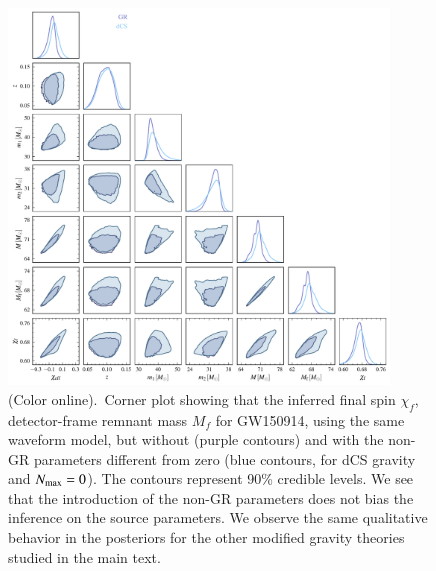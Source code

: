 \documentclass[twocolumn,
               prd,
               aps,
               superscriptaddress,
               tightenlines,
               nofootinbib,
               eqsecnum,
               amsfonts,
               amsmath,
               longbibliography]{revtex4-1}
\newcommand{\hs}[1]{{\textcolor{blue}{{[HS: #1]}} }}
\begin{document}
\begin{figure}[t]
\includegraphics[width=0.9\textwidth]{figs/tmp_GW150914_intrinsic_params.pdf}
\caption{(Color online).~Corner plot showing that the inferred final spin $\chi_f$,
detector-frame remnant mass $M_f$ for GW150914, using the same waveform model,
but without (purple contours) and with the non-GR parameters different from zero (blue contours, for
dCS gravity and $N_{\rm max}=0$). The contours represent 90\% credible levels.
%
We see that the introduction of the non-GR parameters does not bias the
inference on the source parameters.
%
We observe the same qualitative behavior in the posteriors for the other modified gravity theories
studied in the main text.
}
\label{fig:corner_plot_all}
\end{figure}

%

\end{document}
